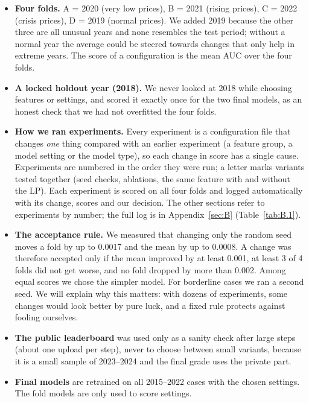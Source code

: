 \begin{disposition}
\begin{itemize}
\tightlist
\item
  \textbf{Four folds.} A = 2020 (very low prices), B = 2021 (rising prices), C = 2022 (crisis prices), D = 2019 (normal prices). We added 2019 because the other three are all unusual years and none resembles the test period; without a normal year the average could be steered towards changes that only help in extreme years. The score of a configuration is the mean AUC over the four folds.
\item
  \textbf{A locked holdout year (2018).} We never looked at 2018 while choosing features or settings, and scored it exactly once for the two final models, as an honest check that we had not overfitted the four folds.
\item
  \textbf{How we ran experiments.} Every experiment is a configuration file that changes \emph{one} thing compared with an earlier experiment (a feature group, a model setting or the model type), so each change in score has a single cause. Experiments are numbered in the order they were run; a letter marks variants tested together (seed checks, ablations, the same feature with and without the LP). Each experiment is scored on all four folds and logged automatically with its change, scores and our decision. The other sections refer to experiments by number; the full log is in Appendix~\ref{sec:B} (Table~\ref{tab:B.1}).
\item
  \textbf{The acceptance rule.} We measured that changing only the random seed moves a fold by up to 0.0017 and the mean by up to 0.0008. A change was therefore accepted only if the mean improved by at least 0.001, at least 3 of 4 folds did not get worse, and no fold dropped by more than 0.002. Among equal scores we chose the simpler model. For borderline cases we ran a second seed. We will explain why this matters: with dozens of experiments, some changes would look better by pure luck, and a fixed rule protects against fooling ourselves.
\item
  \textbf{The public leaderboard} was used only as a sanity check after large steps (about one upload per step), never to choose between small variants, because it is a small sample of 2023--2024 and the final grade uses the private part.
\item
  \textbf{Final models} are retrained on all 2015--2022 cases with the chosen settings. The fold models are only used to score settings.
\end{itemize}
\end{disposition}


